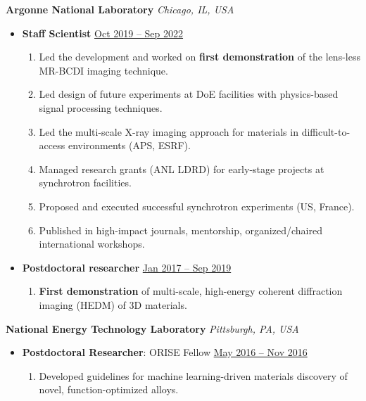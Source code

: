 \documentclass[10.5pt]{article}
\begin{document}
{\color{red}\textbf{Argonne National Laboratory} \hfill \textit{Chicago, IL, USA}}\par
\begin{itemize}
    \item
        \textbf{Staff Scientist}
        \hfill \underline{Oct 2019 -- Sep 2022} \par
        \begin{enumerate}
            \item Led the development and worked on \textbf{first demonstration} of the lens-less MR-BCDI imaging technique.
            \item Led design of future experiments at DoE facilities with physics-based signal processing techniques.
            \item Led the multi-scale X-ray imaging approach for materials in difficult-to-access environments (APS, ESRF).
            \item Managed research grants (ANL LDRD) for early-stage projects at synchrotron facilities.
            \item Proposed and executed successful synchrotron experiments (US, France).
            \item Published in high-impact journals, mentorship, organized/chaired international workshops.
        \end{enumerate}
    \item
        \textbf{Postdoctoral researcher}
        \hfill \underline{Jan 2017 -- Sep 2019} \par
        \begin{enumerate}
            \item \textbf{First demonstration} of multi-scale, high-energy coherent diffraction imaging (HEDM) of 3D materials.
        \end{enumerate}
\end{itemize} 

{\color{red}\textbf{National Energy Technology Laboratory} \hfill \textit{Pittsburgh, PA, USA}}\par
\begin{itemize}
    \item
        \textbf{Postdoctoral Researcher}: ORISE Fellow
        \hfill \underline{May 2016 -- Nov 2016} \par
        \begin{enumerate}
            \item Developed guidelines for machine learning-driven materials discovery of novel, function-optimized alloys.
        \end{enumerate}
\end{itemize} 
\end{document}
